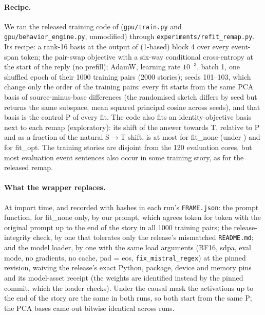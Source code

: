 \paragraph{Recipe.} We ran the released training code of \citet{anonymous2026fitted} (\texttt{gpu/train.py} and \texttt{gpu/behavior\_engine.py}, unmodified) through \texttt{experiments/refit\_remap.py}. Its recipe: a rank-16 basis at the output of (1-based) block 4 over every event-span token; the pair-swap objective with a six-way conditional cross-entropy at the start of the reply (no prefill); AdamW, learning rate $10^{-3}$, batch 1, one shuffled epoch of their 1000 training pairs (2000 stories); seeds 101--103, which change only the order of the training pairs: every fit starts from the same PCA basis of source-minus-base differences (the randomised sketch differs by seed but returns the same subspace, mean squared principal cosine  across seeds), and that basis is the control P of every fit. The code also fits an identity-objective basis next to each remap (exploratory): its shift of the answer towards T, relative to P and as a fraction of the natural S$\to$T shift, is at most  for fit\_none (under \fmtLetter{}) and  for fit\_opt. The training stories are disjoint from the 120 evaluation cores, but most evaluation event sentences also occur in some training story, as for the released remap.

\paragraph{What the wrapper replaces.} At import time, and recorded with hashes in each run's \texttt{FRAME.json}: the prompt function, for fit\_none only, by our \fmtNone{} prompt, which agrees token for token with the original prompt up to the end of the story in all 1000 training pairs; the release-integrity check, by one that tolerates only the release's mismatched \texttt{README.md}; and the model loader, by one with the same load arguments (BF16, sdpa, eval mode, no gradients, no cache, pad = eos, \texttt{fix\_mistral\_regex}) at the pinned revision, waiving the release's exact Python, package, device and memory pins and its model-asset receipt (the weights are identified instead by the pinned commit, which the loader checks). Under the causal mask the activations up to the end of the story are the same in both runs, so both start from the same P; the PCA bases came out bitwise identical across runs.

